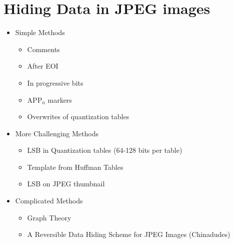 
\section{Hiding Data in JPEG images}

\begin{itemize}
	\item Simple Methods
	\begin{itemize}
		\item Comments
		\item After EOI
		\item In progressive bits
		\item APP$_n$ markers
		\item Overwrites of quantization tables
	\end{itemize}
	\item More Challenging Methods
	\begin{itemize}
		\item LSB in Quantization tables (64-128 bits per table)
		\item Template from Huffman Tables
		\item LSB on JPEG thumbnail
	\end{itemize}
	\item Complicated Methods
	\begin{itemize}
		\item Graph Theory
		\item A Reversible Data Hiding Scheme for JPEG Images (Chinadudes)
	\end{itemize}
\end{itemize}